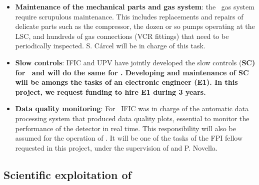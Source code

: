 \begin{itemize}
    \item {\bf Maintenance of the mechanical parts and gas system}:  the \Next\ gas system require scrupulous maintenance. This includes replacements and repairs of delicate parts such as the compressor, the dozen or so pumps operating at the LSC, and hundreds of gas connections (VCR fittings) that need to be periodically inspected. S. C\'arcel will be in charge of this task.
    \item {\bf Slow controls}: IFIC and UPV have jointly developed the slow controls (\bf SC) for \NEW\ and will do the same for \Next. Developing and maintenance of SC will be amongs the tasks of an electronic engineer (E1). In this project, we request funding to hire E1 during 3 years.  
    \item {\bf Data quality monitoring}: For \NEW\ IFIC was in charge of the automatic data processing system that produced data quality plots, essential to monitor the performance of the detector in real time. This responsibility will also be assumed for the operation of \Next. It will be one of the tasks of the FPI fellow requested in this project, under the supervision of and P. Novella.   
\end{itemize}



\indent

\subsection*{Scientific exploitation of \Next}

